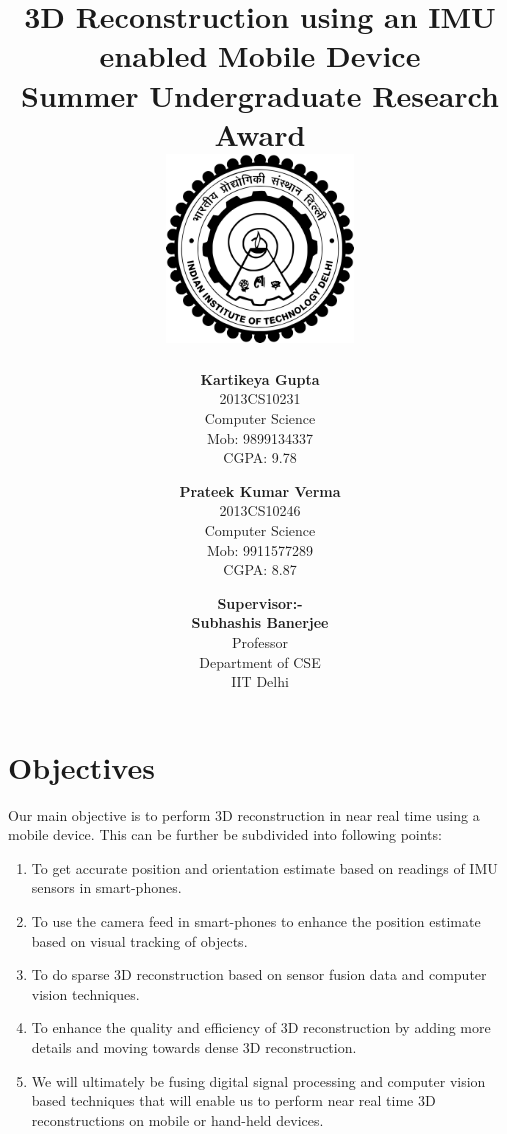 \documentclass{article}
\title{\vspace*{\fill} \textbf{3D Reconstruction using an IMU enabled Mobile Device}
	  \\ {\large \textbf{Summer Undergraduate Research Award}}
	  \\  \vspace{3mm} \includegraphics[width=5cm]{logo.png}}
\author{
	\textbf{Kartikeya Gupta}\\ 
	2013CS10231\\
	Computer Science\\
	Mob: 9899134337\\
	CGPA: 9.78
	\and
	\textbf{Prateek Kumar Verma}\\ 
	2013CS10246\\
	Computer Science\\
	Mob: 9911577289\\
	CGPA: 8.87
}
\date{\textbf{Supervisor:-} \\ \textbf{Subhashis Banerjee} \\ Professor \\ Department of CSE \\ IIT Delhi \vspace*{\fill}}
\begin{document}
	\maketitle

	\newpage

	\section{Objectives} 
		Our main objective is to perform 3D reconstruction in near real time using a mobile device. This can be further be subdivided into following points:
		\begin{enumerate}
			\item 
				To get accurate position and orientation estimate based on readings of IMU sensors in smart-phones. 
			\item
				To use the camera feed in smart-phones to enhance the position estimate based on visual tracking of objects.
			\item 
				To do sparse 3D reconstruction based on sensor fusion data and computer vision techniques.
			\item
				To enhance the quality and efficiency of 3D reconstruction by adding more details and moving towards dense 3D reconstruction.
			\item
				We will ultimately be fusing digital signal processing and computer vision based techniques that will enable us to perform near real time 3D reconstructions on mobile or hand-held devices.
		\end{enumerate}
\end{document}
